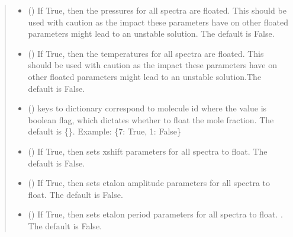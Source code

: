 \documentclass[letterpaper,10pt,english]{sphinxmanual}
\begin{document}
\begin{fulllineitems}
\begin{fulllineitems}
\begin{quote}
\begin{description}
\begin{itemize}
\item {} 
\sphinxAtStartPar
{} (\sphinxstyleliteralemphasis{\sphinxupquote{, }}) \textendash{} If True, then the pressures for all spectra are floated.  This should be used with caution as the impact these parameters have on other floated parameters might lead to an unstable solution. The default is False.

\item {} 
\sphinxAtStartPar
{} (\sphinxstyleliteralemphasis{\sphinxupquote{, }}) \textendash{} If True, then the temperatures for all spectra are floated. This should be used with caution as the impact these parameters have on other floated parameters might lead to an unstable solution.The default is False.

\item {} 
\sphinxAtStartPar
{} (\sphinxstyleliteralemphasis{\sphinxupquote{, }}) \textendash{} keys to dictionary correspond to molecule id where the value is boolean flag, which dictates whether to float the mole fraction. The default is \{\}. Example: \{7: True, 1: False\}

\item {} 
\sphinxAtStartPar
{} (\sphinxstyleliteralemphasis{\sphinxupquote{, }}) \textendash{} If True, then sets x\sphinxhyphen{}shift parameters for all spectra to float. The default is False.

\item {} 
\sphinxAtStartPar
{} (\sphinxstyleliteralemphasis{\sphinxupquote{, }}) \textendash{} If True, then sets etalon amplitude parameters for all spectra to float. The default is False.

\item {} 
\sphinxAtStartPar
{} (\sphinxstyleliteralemphasis{\sphinxupquote{, }}) \textendash{} If True, then sets etalon period parameters for all spectra to float. . The default is False.


\end{itemize}
\end{description}
\end{quote}
\end{fulllineitems}
\end{fulllineitems}
\end{document}
